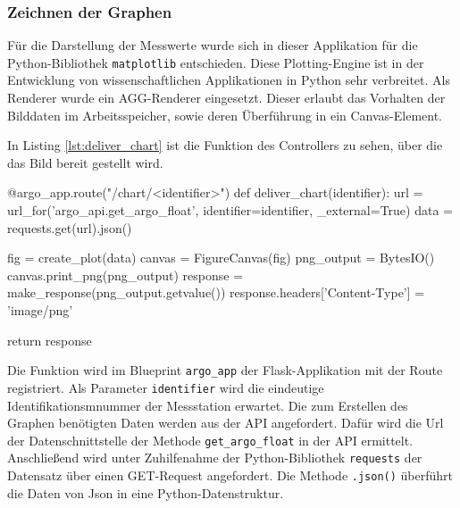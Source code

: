 \subsubsection{Zeichnen der Graphen} \label{sec:ImplementierungPLOTS}


Für die Darstellung der Messwerte wurde sich in dieser Applikation für die Python-Bibliothek \texttt{matplotlib} entschieden.  Diese Plotting-Engine ist in der Entwicklung von wissenschaftlichen Applikationen in Python sehr verbreitet. 
Als Renderer wurde ein AGG-Renderer eingesetzt. Dieser erlaubt das Vorhalten der Bilddaten im Arbeitsspeicher, sowie deren Überführung in ein Canvas-Element.

In Listing \ref{lst:deliver_chart} ist die Funktion des Controllers zu sehen, über die das Bild bereit gestellt wird.

\begin{python}[label={lst:deliver_chart}, caption={Ausliefern eines geploteten Bildes mit Flask}]
@argo_app.route("/chart/<identifier>")
def deliver_chart(identifier):
    url = url_for('argo_api.get_argo_float', identifier=identifier, _external=True)
    data = requests.get(url).json()

    fig = create_plot(data)
    canvas = FigureCanvas(fig)
    png_output = BytesIO()
    canvas.print_png(png_output)
    response = make_response(png_output.getvalue())
    response.headers['Content-Type'] = 'image/png'

    return response
\end{python}

Die Funktion wird im Blueprint \texttt{argo\_app} der Flask-Applikation mit der Route registriert. Als Parameter \texttt{identifier}  wird die eindeutige Identifikationsmnummer der Messstation erwartet. Die zum Erstellen des Graphen benötigten Daten werden aus der API angefordert. Dafür wird die Url der Datenschnittstelle der Methode \texttt{get\_argo\_float} in der API ermittelt. Anschließend wird unter Zuhilfenahme der Python-Bibliothek \texttt{requests} der Datensatz über einen GET-Request angefordert. Die Methode \texttt{.json()} überführt die Daten von Json in eine Python-Datenstruktur. 

